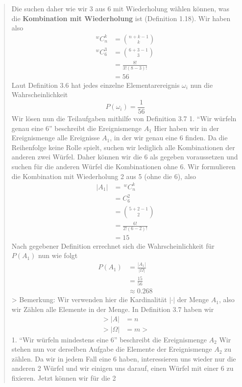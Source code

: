 \documentclass[
]{article}
\begin{document}
\begin{quote}
Die suchen daher wie wir 3 aus 6 mit Wiederholung wählen können, was die
\textbf{Kombination mit Wiederholung} ist (Definition 1.18). Wir haben
also \[\begin{align}
^wC_{n}^k &= \binom{n+k-1}{k} \\
^wC_{6}^3 &= \binom{6+3-1}{3} \\
    &= \frac{8!}{3!(8-3)!} \\
    &= 56
\end{align}\] Laut Definition 3.6 hat jedes einzelne Elementarereignis
\(\omega_{i}\) nun die Wahrscheinlichkeit
\[P(\omega_{i}) = \frac{1}{56}\] Wir lösen nun die Teilaufgaben mithilfe
von Definition 3.7 1. ``Wir würfeln genau eine 6'' beschreibt die
Ereignismenge \(A_{1}\) Hier haben wir in der Ereignismenge alle
Ereignisse \(A_1\), in der wir genau eine 6 finden. Da die Reihenfolge
keine Rolle spielt, suchen wir lediglich alle Kombinationen der anderen
zwei Würfel. Daher können wir die 6 als gegeben voraussetzen und suchen
für die anderen Würfel die Kombinationen ohne 6. Wir formulieren die
Kombination mit Wiederholung 2 aus 5 (ohne die 6), also \[\begin{align}
\lvert A_{1} \rvert &= \,^wC_{n}^k \\
    &= C_{6}^2 \\
    &= \binom{5+2-1}{2} \\
    &= \frac{6!}{2!(6-2)!} \\
    &= 15
\end{align}\] Nach gegebener Definition errechnet sich die
Wahrscheinlichkeit für \(P(A_{1})\) nun wie folgt \[\begin{align}
P(A_{1}) &= \frac{\lvert A_{1} \rvert }{\lvert \Omega \rvert }   \\
     &= \frac{15}{56} \\
     &\approx 0.268
\end{align}\] \textgreater{} Bemerkung: Wir verwenden hier die
Kardinalität \(\lvert \cdot \rvert\) der Menge \(A_{1}\), also wir
Zählen alle Elemente in der Menge. In Definition 3.7 haben wir
\[\begin{align}
> \lvert A \rvert &= n  \\
> \lvert \Omega \rvert &= m  
>\end{align}\] 1. ``Wir würfeln mindestens eine 6'' beschreibt die
Ereignismenge \(A_2\) Wir stehen nun vor derselben Aufgabe die Elemente
der Ereignismenge \(A_2\) zu zählen. Da wir in jedem Fall eine 6 haben,
interessieren uns wieder nur die anderen 2 Würfel und wir einigen uns
darauf, einen Würfel mit einer 6 zu fixieren. Jetzt können wir für die 2

\end{quote}
\end{document}
